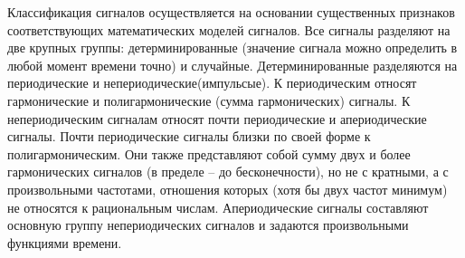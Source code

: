 \documentclass[12pt,a4paper]{scrartcl}
\begin{document}
Классификация сигналов осуществляется на основании существенных признаков соответствующих математических моделей сигналов. Все сигналы разделяют на две крупных группы: детерминированные (значение сигнала можно определить в любой момент времени точно) и случайные. Детерминированные разделяются на периодические и непериодические(импульсые). К периодическим относят гармонические и полигармонические (сумма гармонических) сигналы. К непериодическим сигналам относят почти периодические и апериодические сигналы. Почти периодические сигналы близки по своей форме к полигармоническим. Они также представляют собой сумму двух и более гармонических сигналов (в пределе – до бесконечности), но не с кратными, а с произвольными частотами, отношения которых (хотя бы двух частот минимум) не относятся к рациональным числам. Апериодические сигналы составляют основную группу непериодических сигналов и задаются произвольными функциями времени.\\
\\
\end{document}
